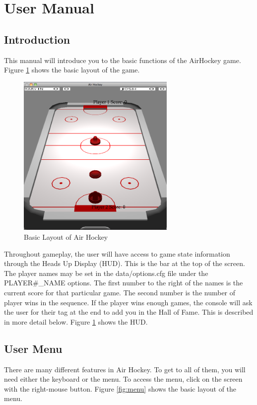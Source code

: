 \documentclass[10pt]{report}
\begin{document}
\clearpage
\section*{User Manual}
\subsection*{Introduction}
This manual will introduce you to the basic functions of the AirHockey 
game. Figure \ref{fig:game} shows the basic layout of the game.

\begin{figure}[!h]
\centering
\includegraphics[width=3in]{game.png}
\caption{Basic Layout of Air Hockey}
\label{fig:game}
\end{figure}

Throughout gameplay, the user will have access to game state information through the
Heads Up Display (HUD). This is the bar at the top of the screen. The player names may be set
in the data/options.cfg file under the PLAYER\#\_NAME options. The first number to the right of the
names is the current score for that particular game. The second number is the number of player wins 
in the sequence. If the player wins enough games, the console will ask the user for their tag
at the end to add you in the Hall of Fame. This is described in more detail below. Figure 
\ref{fig:game} shows the HUD.

\clearpage
\subsection*{User Menu}
There are many different features in Air Hockey. To get to all of them, you will
need either the keyboard or the menu. To access the menu, click on the screen with
the right-mouse button. Figure \ref{fig:menu} shows the basic layout of the menu. 
\end{document}
